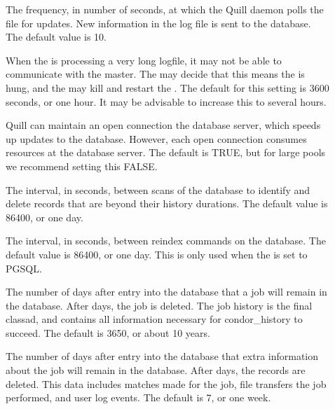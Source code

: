 \begin{description}
\item[] \label{param:QuillPollingPeriod}
  The frequency, in number of seconds, at which the Quill daemon
  polls the file  for updates.
  New information in the log file is sent to the database.
  The default value is 10.

\item[]
  When the  is processing a very long logfile, it 
  may not be able to communicate with the master. The  may
  decide that this means the  is hung, and the 
  may kill and restart the . 
  The default for this setting is 3600 seconds, or one hour. It may be
  advisable to increase this to several hours. 

\item[] \label{param:QuillMaintainDBConn}
  Quill can maintain an open connection the database server, which speeds up
  updates to the database.
  However, each open connection consumes resources at the database server.
  The default is TRUE, but for large pools we recommend setting this
  FALSE.

\item[] 
  \label{param:QuillDatabasePurgeInterval}
  The interval, in seconds, between scans of the database to identify and
  delete records that are beyond their history durations. 
  The default value is 86400, or one day.

\item[] 
  \label{param:QuillDatabaseReindexInterval}
  The interval, in seconds, between reindex commands on the database.
  The default value is 86400, or one day.
  This is only used when the  is set to PGSQL.

\item[] \label{param:QuillJobHistoryDuration}
  The number of days after entry into the database that a job will
  remain in the database.
  After  days, the job is deleted.
  The job history is the final classad, and contains all information 
  necessary for condor\_history to succeed.
  The default is 3650, or about 10 years. 

\item[] \label{param:QuillRunHistoryDuration}
  The number of days after entry into the database that extra information 
  about the job will remain in the database.
  After  days, the records are deleted.
  This data includes matches made for the job, file transfers the job 
  performed, and user log events.
  The default is 7, or one week. 


\end{description}
